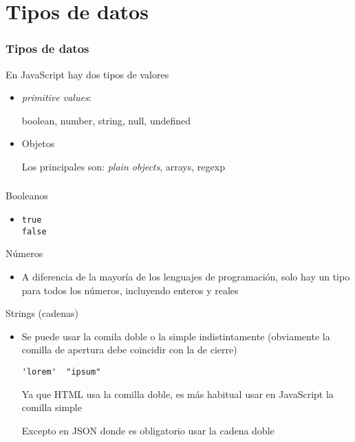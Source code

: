 \documentclass[ucs]{beamer}
\begin{document}
\section{Tipos de datos}
\begin{frame}[fragile]
\frametitle{Tipos de datos}

En JavaScript hay dos tipos de valores

    \begin{itemize}
\item
\emph{primitive values}:

boolean, number, string, null, undefined

\item
Objetos

Los principales son: 
\emph{plain objects}, arrays, regexp

    \end{itemize}

\end{frame}



\begin{frame}[fragile]
\frametitle{}

Booleanos
    \begin{itemize}
    \item

  \begin{scriptsize}
  \begin{verbatim}
true
false
  \end{verbatim}
  \end{scriptsize}
\end{itemize}


Números

    \begin{itemize}
    \item
A diferencia de la mayoría de los lenguajes de programación, 
solo hay un tipo para todos los números, incluyendo enteros y reales
    \end{itemize}


Strings (cadenas)

    \begin{itemize}
    \item
Se puede usar la comila doble o la simple indistintamente (obviamente la
comilla de apertura debe coincidir con la de cierre)

  \begin{scriptsize}
  \begin{verbatim}
'lorem'  "ipsum"
  \end{verbatim}
  \end{scriptsize}

Ya que HTML usa la comilla doble, es más habitual usar en JavaScript la comilla simple

Excepto en JSON donde es obligatorio usar la cadena doble

    \end{itemize}

\end{frame}
\end{document}
